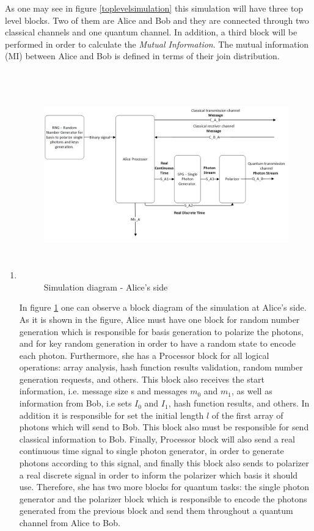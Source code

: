 As one may see in figure \ref{toplevelsimulation} this simulation will have three top level blocks. Two of them are Alice and Bob and they are connected through two classical channels and one quantum channel. In addition, a third block will be performed in order to calculate the \textit{Mutual Information}. The mutual information (MI) between Alice and Bob is defined in terms of their join distribution.


\begin{enumerate}
  \item

  \begin{figure}[h]
	\centering
	\includegraphics[width=1.1\textwidth, height=9cm]{./sdf/ot_with_discrete_variables/figures/Simulation_Alice.png}
	\caption{Simulation diagram - Alice's side}\label{simulationalice}
\end{figure}

    In figure \ref{simulationalice} one can observe a block diagram of the simulation at Alice's side. As it is shown in the figure, Alice must have one block for random number generation which is responsible for basis generation to polarize the photons, and for key random generation in order to have a random state to encode each photon. Furthermore, she has a Processor block for all logical operations: array analysis, hash function results validation, random number generation requests, and others. This block also receives the start information, i.e. message size s and messages $m_{0}$ and $m_{1}$, as well as information from Bob, i.e sets $I_{0}$ and $I_{1}$, hash function results, and others. In addition it is responsible for set the initial length $l$ of the first array of photons which will send to Bob. This block also must be responsible for send classical information to Bob. Finally, Processor block will also send a real continuous time signal to single photon generator, in order to generate photons according to this signal, and finally this block also sends to polarizer a real discrete signal in order to inform the polarizer which basis it should use. Therefore, she has two more blocks for quantum tasks: the single photon generator and the polarizer block which is responsible to encode the photons generated from the previous block and send them throughout a quantum channel from Alice to Bob.


\end{enumerate}
